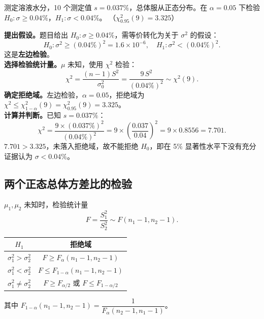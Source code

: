 ﻿\documentclass[lang=cn,11pt]{elegantbook}
\begin{document}
\begin{exercise}\label{exer:9-chi2-left}
测定溶液水分，10 个测定值 \(s=0.037\%\)，总体服从正态分布。在 \(\alpha=0.05\) 下检验 \(H_0\colon \sigma \geq 0.04\%\)，\(H_1\colon \sigma < 0.04\%\)。
（\(\chi^2_{0.95}(9)=3.325\)）
\end{exercise}
\begin{solution}
\textbf{提出假设。}题目给出 \(H_0\colon \sigma \geq 0.04\%\)，需等价转化为关于 \(\sigma^2\) 的假设：
\[
H_0\colon \sigma^2 \geq (0.04\%)^2 = 1.6\times10^{-6},\quad H_1\colon \sigma^2 < (0.04\%)^2.
\]
这是\textbf{左边检验}。\\
\textbf{选择检验统计量。}\(\mu\) 未知，使用 \(\chi^2\) 检验：
\[
\chi^2 = \frac{(n-1)S^2}{\sigma_0^2} = \frac{9\,S^2}{(0.04\%)^2} \sim \chi^2(9).
\]
\textbf{确定拒绝域。}左边检验，\(\alpha=0.05\)，拒绝域为 \(\chi^2 \leq \chi^2_{1-\alpha}(9) = \chi^2_{0.95}(9) = 3.325\)。\\
\textbf{计算并判断。}已知 \(s=0.037\%\)：
\[
\chi^2 = \frac{9 \times (0.037\%)^2}{(0.04\%)^2} = 9 \times \left(\frac{0.037}{0.04}\right)^{\!2} = 9 \times 0.8556 = 7.701.
\]
\(7.701 > 3.325\)，未落入拒绝域，故不能拒绝 \(H_0\)，即在 5\% 显著性水平下没有充分证据认为 \(\sigma < 0.04\%\)。
\end{solution}



\subsection{两个正态总体方差比的检验}

\begin{property}[F 检验]\label{prop:f-test}
\(\mu_1, \mu_2\) 未知时，检验统计量
\[
F = \frac{S_1^2}{S_2^2} \sim F(n_1-1, n_2-1).
\]
\begin{center}
\begin{tabular}{cc}
\toprule
\(H_1\) & 拒绝域 \\
\midrule
\(\sigma_1^2 > \sigma_2^2\) & \(F \geq F_\alpha(n_1-1, n_2-1)\) \\[4pt]
\(\sigma_1^2 < \sigma_2^2\) & \(F \leq F_{1-\alpha}(n_1-1, n_2-1)\) \\[4pt]
\(\sigma_1^2 \neq \sigma_2^2\) & \(F \geq F_{\alpha/2}\) 或 \(F \leq F_{1-\alpha/2}\) \\
\bottomrule
\end{tabular}
\end{center}
其中 \(F_{1-\alpha}(n_1-1,n_2-1) = \dfrac{1}{F_\alpha(n_2-1,n_1-1)}\)。
\end{property}
\end{document}
